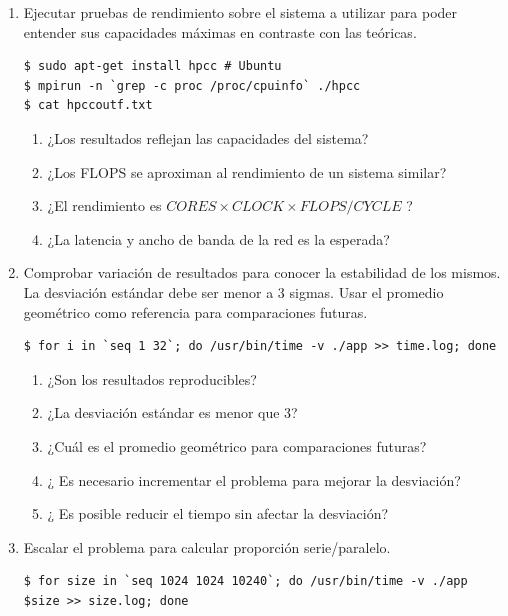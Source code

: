\documentclass[a4paper]{report}
\begin{document}
\begin{enumerate}
\item Ejecutar pruebas de rendimiento sobre el sistema a utilizar para poder entender sus capacidades máximas en contraste con las teóricas.

\begin{lstlisting}
$ sudo apt-get install hpcc # Ubuntu
$ mpirun -n `grep -c proc /proc/cpuinfo` ./hpcc
$ cat hpccoutf.txt
\end{lstlisting}

\begin{enumerate}
\item ¿Los resultados reflejan las capacidades del sistema?
\item ¿Los FLOPS se aproximan al rendimiento de un sistema similar?
\item ¿El rendimiento es $ CORES \times CLOCK \times FLOPS/CYCLE $ ?
\item ¿La latencia y ancho de banda de la red es la esperada?
\end{enumerate}

\item Comprobar variación de resultados para conocer la estabilidad de los mismos. La desviación estándar debe ser menor a 3 sigmas. Usar el promedio geométrico como referencia para comparaciones futuras.

\begin{lstlisting}
$ for i in `seq 1 32`; do /usr/bin/time -v ./app >> time.log; done
\end{lstlisting}

\begin{enumerate}
\item ¿Son los resultados reproducibles?
\item ¿La desviación estándar es menor que 3?
\item ¿Cuál es el promedio geométrico para comparaciones futuras?
\item ¿ Es necesario incrementar el problema para mejorar la desviación?
\item ¿ Es posible reducir el tiempo sin afectar la desviación?
\end{enumerate}

\item Escalar el problema para calcular proporción serie/paralelo.

\begin{lstlisting}
$ for size in `seq 1024 1024 10240`; do /usr/bin/time -v ./app $size >> size.log; done
\end{lstlisting}


\end{enumerate}
\end{document}
